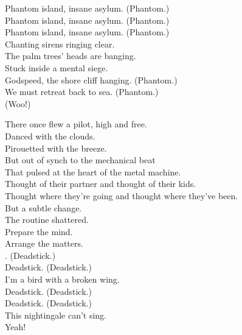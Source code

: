 Phantom island, insane asylum. (Phantom.) \\
Phantom island, insane asylum. (Phantom.) \\
Phantom island, insane asylum. (Phantom.) \\
Chanting sirens ringing clear. \\

The palm trees' heads are banging. \\
Stuck inside a mental siege. \\
Godspeed, the shore cliff hanging. (Phantom.) \\
We must retreat back to sea. (Phantom.) \\
(Woo!) \\





There once flew a pilot, high and free. \\
Danced with the clouds. \\
Pirouetted with the breeze. \\
But out of synch to the mechanical beat \\
That pulsed at the heart of the metal machine. \\

Thought of their partner and thought of their kids. \\
Thought where they're going and thought where they've been. \\
But a subtle change. \\
The routine shattered. \\
Prepare the mind. \\
Arrange the matters. \\

. (Deadstick.) \\
Deadstick. (Deadstick.) \\
I'm a bird with a broken wing. \\
Deadstick. (Deadstick.) \\
Deadstick. (Deadstick.) \\
This nightingale can't sing. \\
Yeah! \\


